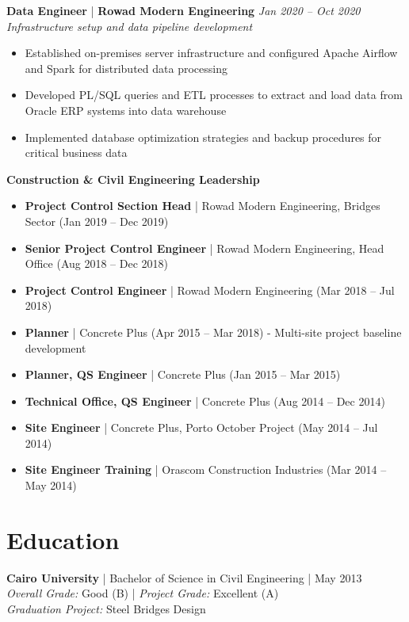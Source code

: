 \documentclass[10pt, letterpaper]{article}
\newcommand{\jobtitle}[4]{
    \textbf{\textcolor{primaryColor}{#1}} | \textbf{#2} \hfill \textit{#3} \\
    \textit{#4}
}
\begin{document}
\jobtitle{Data Engineer}{Rowad Modern Engineering}{Jan 2020 – Oct 2020}{Infrastructure setup and data pipeline development}
\begin{itemize}[leftmargin=1cm, itemsep=0.3ex]
    \item Established on-premises server infrastructure and configured Apache Airflow and Spark for distributed data processing
    \item Developed PL/SQL queries and ETL processes to extract and load data from Oracle ERP systems into data warehouse
    \item Implemented database optimization strategies and backup procedures for critical business data
\end{itemize}

\newpage

\textbf{\textcolor{primaryColor}{Construction \& Civil Engineering Leadership}}
\begin{itemize}[leftmargin=*]
    \item \textbf{Project Control Section Head} | Rowad Modern Engineering, Bridges Sector (Jan 2019 – Dec 2019)
    \item \textbf{Senior Project Control Engineer} | Rowad Modern Engineering, Head Office (Aug 2018 – Dec 2018)
    \item \textbf{Project Control Engineer} | Rowad Modern Engineering (Mar 2018 – Jul 2018)
    \item \textbf{Planner} | Concrete Plus (Apr 2015 – Mar 2018) - Multi-site project baseline development
    \item \textbf{Planner, QS Engineer} | Concrete Plus (Jan 2015 – Mar 2015)
    \item \textbf{Technical Office, QS Engineer} | Concrete Plus (Aug 2014 – Dec 2014)
    \item \textbf{Site Engineer} | Concrete Plus, Porto October Project (May 2014 – Jul 2014)
    \item \textbf{Site Engineer Training} | Orascom Construction Industries (Mar 2014 – May 2014)
\end{itemize}

\section{Education}
\textbf{Cairo University} | Bachelor of Science in Civil Engineering | May 2013 \\
\textit{Overall Grade:} Good (B) | \textit{Project Grade:} Excellent (A) \\
\textit{Graduation Project:} Steel Bridges Design
\end{document}
